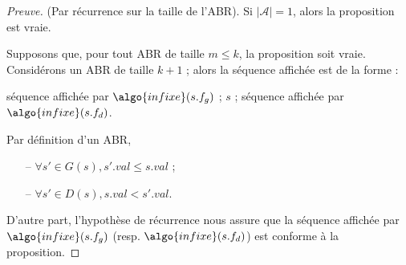 \begin{proof}[Preuve] (Par récurrence sur la taille de l'ABR).
Si $|\mathcal{A}| = 1$, alors la proposition est vraie.

Supposons que, pour tout ABR de taille $m\leq k$, la proposition soit vraie.
Considérons un ABR de taille $k+1$ ; alors la séquence affichée est
de la forme :
\begin{center}
séquence affichée par $\algo{infixe}(s.f_g)$ ; $s$ ; 
séquence affichée par $\algo{infixe}(s.f_d)$. 
\end{center}
Par définition d'un ABR, 
\begin{itemize}
\item[--]  $\forall s' \in G(s), s'.val \leq s.val $ ;
\item[--] $\forall s' \in D(s), s.val < s'.val$.
\end{itemize}
D'autre part, l'hypothèse de récurrence nous assure que 
la séquence affichée par $\algo{infixe}(s.f_g)$ 
(resp. $\algo{infixe}(s.f_d)$) 
est conforme à
la proposition.
\end{proof}

